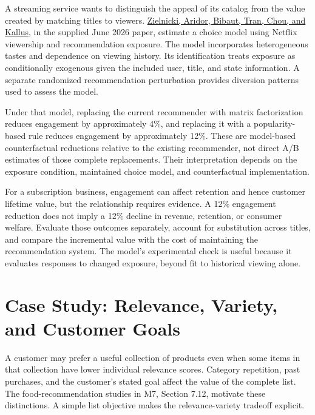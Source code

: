 \noindent A streaming service wants to distinguish the appeal of its catalog from
the value created by matching titles to viewers.
\href{https://www.ifo.de/en/cesifo/publications/2026/working-paper/value-personalized-recommendations-evidence-netflix}{Zielnicki,
Aridor, Bibaut, Tran, Chou, and Kallus}, in the supplied June 2026
paper, estimate a choice model using Netflix viewership and
recommendation exposure. The model incorporates heterogeneous tastes and
dependence on viewing history. Its identification treats exposure as
conditionally exogenous given the included user, title, and state
information. A separate randomized recommendation perturbation provides
diversion patterns used to assess the model.

Under that model, replacing the current recommender with matrix
factorization reduces engagement by approximately 4\%, and replacing it
with a popularity-based rule reduces engagement by approximately 12\%.
These are model-based counterfactual reductions relative to the existing
recommender, not direct A/B estimates of those complete replacements.
Their interpretation depends on the exposure condition, maintained
choice model, and counterfactual implementation.

For a subscription business, engagement can affect retention and hence
customer lifetime value, but the relationship requires evidence. A 12\%
engagement reduction does not imply a 12\% decline in revenue,
retention, or consumer welfare. Evaluate those outcomes separately,
account for substitution across titles, and compare the incremental
value with the cost of maintaining the recommendation system. The
model's experimental check is useful because it evaluates responses to
changed exposure, beyond fit to historical viewing alone.

\hypertarget{M08-case-study-relevance-variety-and-customer-goals}{%
\section{Case Study: Relevance, Variety, and Customer
Goals}\label{M08-case-study-relevance-variety-and-customer-goals}}

\noindent A customer may prefer a useful collection of products even when some
items in that collection have lower individual relevance scores.
Category repetition, past purchases, and the customer's stated goal
affect the value of the complete list. The food-recommendation studies
in M7, Section 7.12, motivate these distinctions. A simple list
objective makes the relevance-variety tradeoff explicit.

